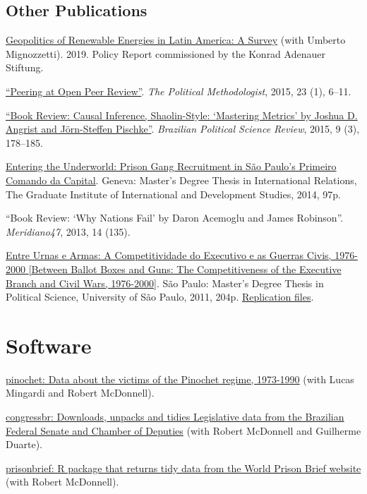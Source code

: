 \documentclass[a4paper]{article}
\renewenvironment{itemize}{
	\begin{list}{}{
			\setlength{\leftmargin}{1.5em}
		}
		}{
	\end{list}
}
\begin{document}
\subsection*{Other Publications}

\begin{itemize}
\item \href{https://www.kas.de/documents/273477/273526/Geopolitics+of+Renewable+Energy+in+Latin+America+-+A+Survey.pdf/9fe39ef1-6028-0836-90b0-aada31cb6769?version=1.0&t=1551887777018}{Geopolitics of Renewable Energies in Latin America: A Survey} (with Umberto Mignozzetti). 2019. Policy Report commissioned by the Konrad Adenauer Stiftung.
\item \href{https://thepoliticalmethodologist.files.wordpress.com/2016/02/tpm_v23_n1.pdf}{``Peering at Open Peer Review''}. \textit{The Political Methodologist}, 2015, 23 (1), 6--11.
\item \href{http://www.scielo.br/readcube/epdf.php?doi=10.1590/1981-38212015000300026&pid=S1981-38212015000300178&pdf_path=bpsr/v9n3/1981-3821-bpsr-9-3-0178.pdf&lang=en}{``Book Review: Causal Inference, Shaolin-Style: `Mastering Metrics' by Joshua D. Angrist and J\"{o}rn-Steffen Pischke''}. \textit{Brazilian Political Science Review}, 2015, 9 (3), 178--185.
\item \href{https://doi.org/10.6084/m9.figshare.1209203}{Entering the Underworld: Prison Gang Recruitment in S\~{a}o Paulo's Primeiro Comando da Capital}. Geneva: Master's Degree Thesis in International Relations, The Graduate Institute of International and Development Studies, 2014, 97p.
\item ``Book Review: `Why Nations Fail' by Daron Acemoglu and James Robinson''. \textit{Meridiano47}, 2013, 14 (135).
\item \href{https://doi.org/10.6084/m9.figshare.963082}{Entre Urnas e Armas: A Competitividade do Executivo e as Guerras Civis, 1976-2000 {[}Between Ballot Boxes and Guns: The Competitiveness of the Executive Branch and Civil Wars, 1976-2000{]}}. S\~{a}o Paulo: Master's Degree Thesis in Political Science, University of S\~{a}o Paulo, 2011, 204p. \href{https://doi.org/10.6084/m9.figshare.963183}{Replication files}.
\end{itemize}

\section*{Software}

\begin{itemize}
  \item \href{https://danilofreire.github.io/pinochet}{pinochet: Data about the victims of the Pinochet regime, 1973-1990} (with Lucas Mingardi and Robert McDonnell).
  \item \href{https://github.com/RobertMyles/congressbr}{congressbr: Downloads, unpacks and tidies Legislative data from the Brazilian Federal Senate and Chamber of Deputies} (with Robert McDonnell and Guilherme Duarte).
  \item \href{https://danilofreire.github.io/prisonbrief}{prisonbrief: R package that returns tidy data from the World Prison Brief website} (with Robert McDonnell).
\end{itemize}
\end{document}
